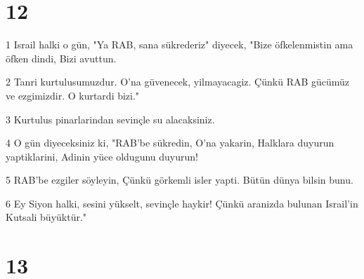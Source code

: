 \chapter{12}

\par 1 Israil halki o gün, "Ya RAB, sana sükrederiz" diyecek, "Bize öfkelenmistin ama öfken dindi, Bizi avuttun.
\par 2 Tanri kurtulusumuzdur. O'na güvenecek, yilmayacagiz. Çünkü RAB gücümüz ve ezgimizdir. O kurtardi bizi."
\par 3 Kurtulus pinarlarindan sevinçle su alacaksiniz.
\par 4 O gün diyeceksiniz ki, "RAB'be sükredin, O'na yakarin, Halklara duyurun yaptiklarini, Adinin yüce oldugunu duyurun!
\par 5 RAB'be ezgiler söyleyin, Çünkü görkemli isler yapti. Bütün dünya bilsin bunu.
\par 6 Ey Siyon halki, sesini yükselt, sevinçle haykir! Çünkü aranizda bulunan Israil'in Kutsali büyüktür."

\chapter{13}

